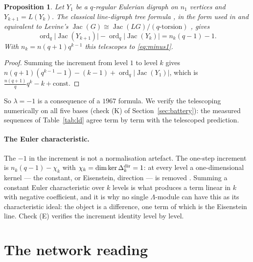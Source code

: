 \documentclass[11pt]{article}
\theoremstyle{plain}
\newtheorem{proposition}[theorem]{Proposition}
\theoremstyle{remark}
\newcommand{\Jac}{\operatorname{Jac}}
\newcommand{\ord}{\operatorname{ord}}
\newcommand{\La}{\Lambda}
\begin{document}
\begin{proposition}\label{prop:telescope}
Let $Y_1$ be a $q$-regular Eulerian digraph on $n_1$ vertices and $Y_{k+1}=L(Y_k)$. The
classical line-digraph tree formula \cite{Knuth67}, in the form used in
{\rm\cite[III]{ANCFT}} and equivalent to Levine's $\Jac(G)\cong\Jac(LG)/(\text{$q$-torsion})$
{\rm\cite{Levine11}}, gives
\[
\ord_q\bigl|\Jac(Y_{k+1})\bigr|-\ord_q\bigl|\Jac(Y_k)\bigr|=n_k(q-1)-1 .
\]
With $n_k=n(q{+}1)q^{k-1}$ this telescopes to \eqref{eq:minus1}.
\end{proposition}

\begin{proof}
Summing the increment from level $1$ to level $k$ gives
$n(q{+}1)(q^{k-1}-1)-(k-1)+\ord_q|\Jac(Y_1)|$, which is
$\frac{n(q+1)}{q}q^{k}-k+\text{const}$.
\end{proof}

So $\lambda=-1$ is a consequence of a $1967$ formula. We verify the telescoping numerically
on all five bases (check (K) of Section~\ref{sec:battery}): the measured sequences of
Table~\ref{tab:ld} agree term by term with the telescoped prediction.

\paragraph{The Euler characteristic.}
The $-1$ in the increment is not a normalisation artefact. The one-step increment is
$n_k(q-1)-\chi_k$ with $\chi_k=\dim\ker\Delta^{\rm dir}_k=1$: at every level a
one-dimensional kernel --- the constant, or Eisenstein, direction --- is removed
\cite[III]{ANCFT}. Summing a constant Euler characteristic over $k$ levels is what produces
a term linear in $k$ with negative coefficient, and it is why no single $\La$-module can
have this as its characteristic ideal: the object is a difference, one term of which is the
Eisenstein line. Check (E) verifies the increment identity level by level.

\section{The network reading}\label{sec:net}
\end{document}
